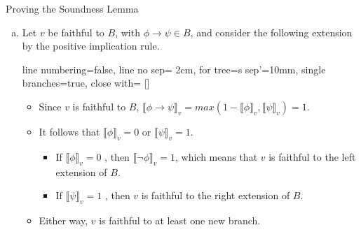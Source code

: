 \begin{frame}{Proving the Soundness Lemma}

\begin{enumerate}[(a)]
\itemsep=16pt
					
		\item Let $v$ be faithful to $B$, with $\phi\to\psi\in B$, and consider the following extension by the positive implication rule.
		
					\begin{center}
					\begin{prooftree}
					{
					line numbering=false,
					line no sep= 2cm,
					for tree={s sep'=10mm},
					single branches=true,
					close with=\xmark
					}
					[\phi\to\psi [\neg \phi ] [\psi ] ]
					\end{prooftree}
					\end{center}
					\medskip
								
		\begin{itemize}
		\itemsep=16pt

									
			\item Since $v$ is faithful to $B$, $\llbracket\phi\to\psi\rrbracket_v=max(1-\llbracket\phi\rrbracket_v, \llbracket\psi\rrbracket_v)=1$. 
			
			\item It follows that $\llbracket\phi\rrbracket_v=0$ or $\llbracket\psi\rrbracket_v=1$.
			
			\medskip
			
		\begin{itemize}
		
			\item If $\llbracket\phi\rrbracket_v=0$ , then $\llbracket\neg\phi\rrbracket_v=1$, which means that $v$ is faithful to the left extension of $B$.

			\item If $\llbracket\psi\rrbracket_v=1$ , then $v$ is faithful to the right extension of $B$.	
		
			\end{itemize}

		\item Either way, $v$ is faithful to at least one new branch.
	
		\end{itemize}
		
\end{enumerate}
	
\end{frame}

